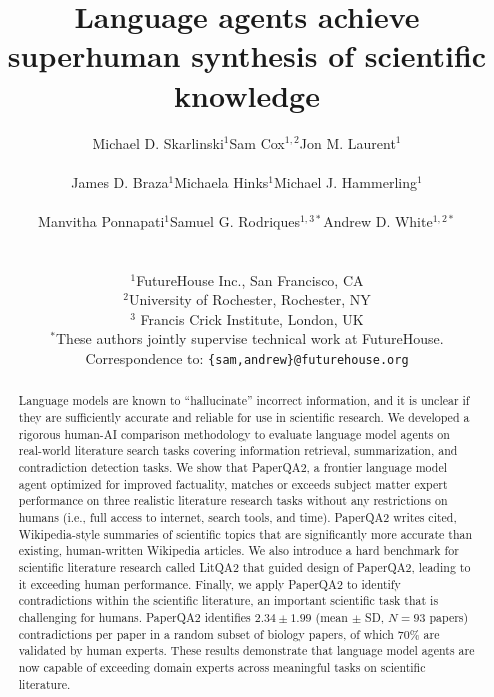 \documentclass{article}
\title{Language agents achieve superhuman synthesis of scientific knowledge
}
\author{
\begin{tabular}{ccc}
Michael D. Skarlinski$^{1}$ & Sam Cox$^{1,2}$ & Jon M. Laurent$^{1}$ \\ \\
James D. Braza$^{1}$ & Michaela Hinks$^{1}$ & Michael J. Hammerling$^{1}$\\ \\
Manvitha Ponnapati$^{1}$ & Samuel G. Rodriques$^{1,3*}$ & Andrew D. White$^{1,2*}$
\end{tabular}
\\
\\
$^{1}$FutureHouse Inc., San Francisco, CA\\
$^{2}$University of Rochester, Rochester, NY\\
$^{3}$ Francis Crick Institute, London, UK\\
$^{*}$These authors jointly supervise technical work at FutureHouse.\\
Correspondence to: \texttt{\{sam,andrew\}@futurehouse.org}
}
\begin{document}
\maketitle


\begin{abstract}
Language models are known to ``hallucinate'' incorrect information, and it is unclear if they are sufficiently accurate and reliable for use in scientific research. We developed a rigorous human-AI comparison methodology to evaluate language model agents on real-world literature search tasks covering information retrieval, summarization, and contradiction detection tasks. We show that PaperQA2, a frontier language model agent optimized for improved factuality, matches or exceeds subject matter expert performance on three realistic literature research tasks without any restrictions on humans (i.e., full access to internet, search tools, and time). PaperQA2 writes cited, Wikipedia-style summaries of scientific topics that are significantly more accurate than existing, human-written Wikipedia articles. We also introduce a hard benchmark for scientific literature research called LitQA2 that guided design of PaperQA2, leading to it exceeding human performance. Finally, we apply PaperQA2 to identify contradictions within the scientific literature, an important scientific task that is challenging for humans. PaperQA2 identifies $2.34 \pm 1.99$ (mean $\pm$ SD, $N=93$ papers) contradictions per paper in a random subset of biology papers, of which $70\%$ are validated by human experts. These results demonstrate that language model agents are now capable of exceeding domain experts across meaningful tasks on scientific literature. 
\end{abstract}
\vspace{0.7cm}


\end{document}
